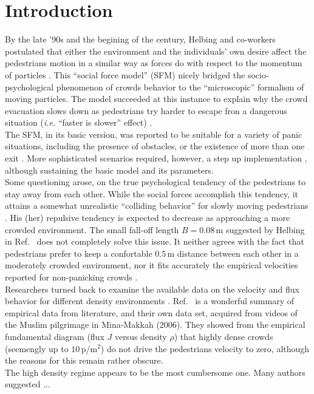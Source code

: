 \section{\label{introduction}Introduction}

By the late '90s and the begining of the century, Helbing and co-workers 
postulated that either the environment and the individuals' own desire affect 
the pedestrians motion in a similar way as forces do with respect to the 
momentum of particles \cite{Helbing1,Helbing4}. This ``social force model'' 
(SFM) nicely bridged the socio-psychological phenomenon of crowds 
behavior to the ``microscopic'' formalism of moving particles. The model 
succeeded at this instance to explain why the crowd evacuation slows down 
as pedestrians try harder to escape fron a dangerous situation 
(\textit{i.e.} ``faster is slower'' effect) \cite{Helbing1,Dorso1,Dorso2}. 
  \\ 

The SFM, in its basic version, was reported to be suitable for a variety of 
panic situations, including the presence of obstacles, or the existence of more 
than one exit \cite{Dorso3,Dorso5}. More sophisticated scenarios required, 
however, a step up implementation \cite{Dorso4,Dorso6,Cornes1}, although 
sustaining the basic model and its parameters.  \\

Some questioning arose, on the true psychological tendency of the pedestrians to 
stay away from each other. While the social forces accomplish this tendency, it 
attains a somewhat unrealistic ``colliding behavior'' for slowly moving 
pedestrians \cite{Lakoba}. His (her) repulsive tendency is expected to decrease 
as approaching a more crowded environment. The small fall-off length $B=0.08\,$m 
suggested by Helbing in Ref.~\cite{Helbing1} does not completely solve this 
issue. It neither agrees with the fact that pedestrians prefer to keep a 
confortable $0.5\,$m distance between each other in a moderately crowded 
environment, nor it fits accurately the empirical velocities reported for 
non-panicking crowds \cite{Lakoba}.  \\

Researchers turned back to examine the available data on the velocity and flux 
behavior for different density environments \cite{helbing3,seyfried1}. 
Ref.~\cite{helbing3} is a wonderful summary of empirical data from literature, 
and their own data set, acquired from videos of the Muslim pilgrimage in 
Mina-Makkah (2006). They showed from the empirical fundamental diagram (flux $J$ 
versus density $\rho$) that highly dense crowds (seemengly up to $10\,$p/m$^2$) 
do not drive the pedestrians velocity to zero, although the reasons for this 
remain rather obscure.   \\

The high density regime appears to be the most cumbersome one. Many authors 
suggested ...   \\